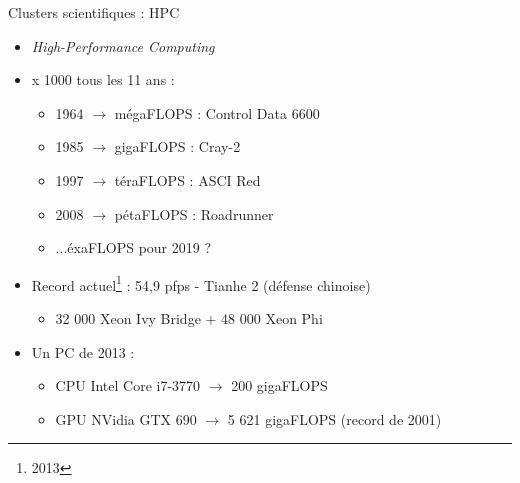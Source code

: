\begin{frame}{Clusters scientifiques : HPC}
\begin{itemize}
\item \textit{High-Performance Computing}
\item <2->x 1000 tous les 11 ans :
\begin{itemize}
\item 1964 $\rightarrow$ mégaFLOPS : Control Data 6600
\item 1985 $\rightarrow$ gigaFLOPS : Cray-2
\item 1997 $\rightarrow$ téraFLOPS : ASCI Red
\item 2008 $\rightarrow$ pétaFLOPS : Roadrunner
\item ...éxaFLOPS pour 2019 ?
\end{itemize}
\item <3->Record actuel\footnote{2013} : 54,9 pfps - Tianhe 2 (défense chinoise)
\begin{itemize}
\item 32 000 Xeon Ivy Bridge + 48 000 Xeon Phi
\end{itemize}

\item <4->Un PC de 2013 :
\begin{itemize}
\item CPU Intel Core i7-3770 $\rightarrow$ 200 gigaFLOPS
\item GPU NVidia GTX 690 $\rightarrow$ 5 621 gigaFLOPS (record de 2001)
\end{itemize}
\end{itemize}
\end{frame}


